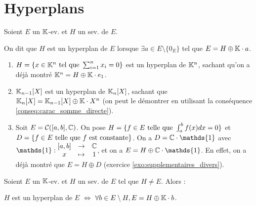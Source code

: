 \documentclass[12pt, a4paper]{report}
\begin{document}
\chapter{Hyperplans}

\begin{definition}[Hyperplan]
    Soient $E$ un $\mathbb{K}$-ev. et $H$ un sev. de $E$.

    On dit que $H$ est un hyperplan de $E$ lorsque $\exists a \in E\setminus\{0_E\}$ tel que $E = H \oplus \mathbb{K} \cdot a$.
\end{definition}

\begin{example}
    \begin{enumerate}
        \item $H = \{ x \in \mathbb{K}^n \text{ tel que } \sum_{i=1}^n x_i = 0\}$ est un hyperplan de $\mathbb{K}^n$, sachant qu'on a déjà montré $\mathbb{K}^n = H \oplus \mathbb{K} \cdot e_1$.
        \item $\mathbb{K}_{n-1}[X]$ est un hyperplan de $\mathbb{K}_n[X]$, sachant que $\mathbb{K}_n[X] = \mathbb{K}_{n-1}[X] \oplus \mathbb{K} \cdot X^n$ (on peut le démontrer en utilisant la conséquence \ref{conseq:carac_somme_directe}).
        \item Soit $E =\mathcal{C}([a,b],\mathbb{C})$. On pose $H = \{ f \in E \text{ telle que } \int_a^b f(x) dx = 0\}$ et $D = \{ f \in E \text{ telle que } f \text{ est constante}\}$. On a $D = \C\cdot\mathds{1}$ avec $\mathds{1} : \begin{matrix}
            [a,b] & \to & \C \\
            x & \mapsto & 1
        \end{matrix}$, et on a $E = H \oplus \C\cdot\mathds{1}$. En effet, on a déjà montré que $E = H \oplus D$ (exercice \ref{exo:supplementaires_divers}).
    \end{enumerate}
\end{example}

\begin{property}
    Soient $E$ un $\mathbb{K}$-ev. et $H$ un sev. de $E$ tel que $H \ne E$. Alors :

    $H$ est un hyperplan de $E$ $\iff$ $\forall b \in E\setminus H, E = H \oplus \mathbb{K} \cdot b$.
\end{property}

\end{document}

